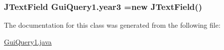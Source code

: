 \subsubsection[{\texorpdfstring{year3}{year3}}]{\setlength{\rightskip}{0pt plus 5cm}J\+Text\+Field Gui\+Query1.\+year3 =new J\+Text\+Field()\hspace{0.3cm}{\ttfamily [protected]}}\hypertarget{classGuiQuery1_ac74d62ae05c068aaa998c52121501978}{}\label{classGuiQuery1_ac74d62ae05c068aaa998c52121501978}


The documentation for this class was generated from the following file\+:\begin{DoxyCompactItemize}
\item 
\hyperlink{GuiQuery1_8java}{Gui\+Query1.\+java}\end{DoxyCompactItemize}
